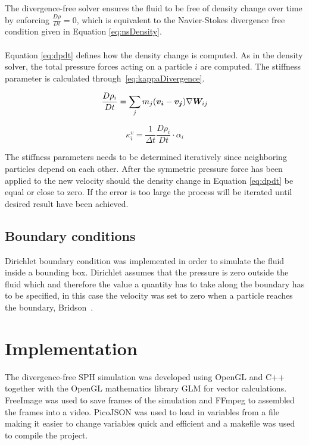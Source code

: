     The divergence-free solver ensures the fluid to be free of density change over time by enforcing $\frac{D\rho}{Dt} = 0$, which is equivalent to the Navier-Stokes divergence free condition given in Equation \ref{eq:nsDensity}. \\ \\ Equation \ref{eq:dpdt} defines how the density change is computed. As in the density solver, the total pressure forces acting on a particle $i$ are computed. The stiffness parameter is calculated through~\ref{eq:kappaDivergence}.

    \begin{equation} \label{eq:dpdt}
        \frac{D\rho_i}{Dt} = \sum_j m_j (\bm{v_i} - \bm{v_j})\nabla \bm{W}_{ij}
    \end{equation}

    \begin{equation}\label{eq:kappaDivergence}
        \kappa_i^v = \frac{1}{\Delta t} \frac{D\rho_i}{Dt} \cdot \alpha_i
    \end{equation}

    The stiffness parameters needs to be determined iteratively since neighboring particles depend on each other. After the symmetric pressure force has been applied to the new velocity should the density change in Equation \ref{eq:dpdt} be equal or close to zero. If the error is too large the process will be iterated until desired result have been achieved.


\subsection{Boundary conditions}
Dirichlet boundary condition was implemented in order to simulate the fluid inside a bounding box. Dirichlet assumes that the pressure is zero outside the fluid which and therefore the value a quantity has to take along the boundary has to be specified, in this case the velocity was set to zero when a particle reaches the boundary, Bridson~\cite{bridson}. 

\section{Implementation}

    The divergence-free SPH simulation was developed using OpenGL and C++ together with the OpenGL mathematics library GLM for vector calculations.
    FreeImage was used to save frames of the simulation and FFmpeg to assembled the frames into a video.
    PicoJSON was used to load in variables from a file making it easier to change variables quick and efficient and a makefile was used to compile the project.

